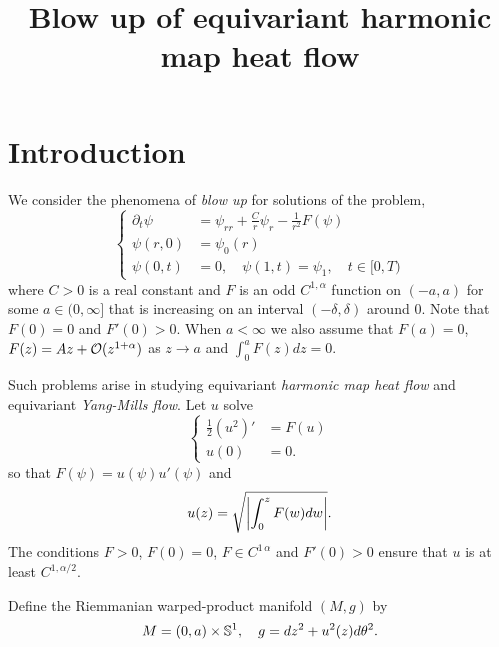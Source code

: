 \documentclass{amsart}
\begin{document}
\title[]
 {Blow up of equivariant harmonic map heat flow}

\curraddr{}
\email{}

\dedicatory{}
\subjclass[2010]{}
\keywords{}

\begin{abstract}
\end{abstract}

\maketitle

\section{Introduction}
\label{sec:intro}

We consider the phenomena of \emph{blow up} for solutions of the problem,
\begin{equation}
\label{eq:pde}
\begin{cases}
\partial_t \psi &= \psi_{rr} + \frac{C}{r} \psi_r - \frac{1}{r^2} F(\psi) \\
\psi(r, 0) &= \psi_0(r) \\
\psi(0, t) &= 0, \quad \psi(1, t) = \psi_1, \quad t \in [0, T)
\end{cases}
\end{equation}
where \(C > 0\) is a real constant and \(F\) is an odd \(C^{1,\alpha}\) function on \((-a, a)\) for some \(a \in (0, \infty]\) that is increasing on an interval \((-\delta, \delta)\) around \(0\). Note that \(F(0) = 0\) and \(F'(0) > 0\). When \(a < \infty\) we also assume that \(F(a) = 0\), \(F(z) = A z +  \operatorname{\mathcal{O}}(z^{1+\alpha})\) as \(z \to a\) and \(\int_0^a F(z) dz = 0\).

Such problems arise in studying equivariant \emph{harmonic map heat flow} and equivariant \emph{Yang-Mills flow}. Let \(u\) solve
\[
\begin{cases}
\frac{1}{2} (u^2)' &= F(u) \\
u(0) &= 0.
\end{cases}
\]
so that \(F(\psi) = u(\psi) u'(\psi)\) and
\[
u(z) = \sqrt{\left|{\int_0^z F(w) dw}\right|}.
\]
The conditions \(F > 0\), \(F(0) = 0\), \(F \in C^{1\,\alpha}\) and \(F'(0) > 0\) ensure that \(u\) is at least \(C^{1,\alpha/2}\).

Define the Riemmanian warped-product manifold \((M, g)\) by
\begin{equation}
\label{eq:warped_product}
M = (0, a) \times \S^1, \quad g = dz^2 + u^2(z) d\theta^2.
\end{equation}
\end{document}
